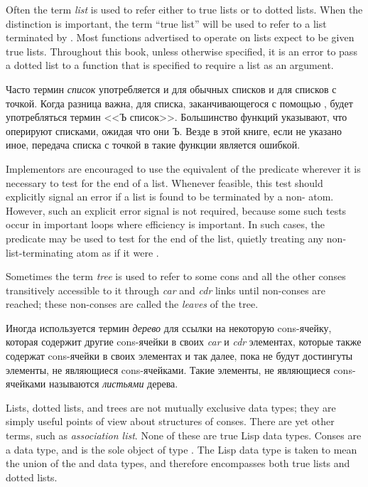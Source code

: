 Often the term {\it list} is used to refer either to true lists or to
dotted lists.  When the distinction is important,
the term ``true list'' will be used to refer to a list
terminated by {\nil}.  Most functions
advertised to operate on lists expect to be given true lists. Throughout
this book, unless otherwise specified, it is an error to pass a dotted
list to a function that is specified to require a list as an argument.

Часто термин {\it список} употребляется и для обычных списков и для списков с
точкой. Когда разница важна, для списка, заканчивающегося с помощью {\nil},
будет употребляться термин <<Ъ список>>. Большинство функций указывают, что
оперируют списками, ожидая что они Ъ. Везде в этой книге, если не указано иное,
передача списка с точкой в такие функции является ошибкой.

\beforenoterule
\begin{implementation}
Implementors are encouraged to use the equivalent
of the predicate  wherever it is necessary to test
for the end of a list.  Whenever feasible, this test should explicitly
signal an error if a list is found to be terminated by a non-{\nil} atom.
However, such an explicit error signal is not required, because
some such tests occur in important loops where efficiency is important.
In such cases, the predicate  may be used to test
for the end of the list, quietly treating any non-{\nil} list-terminating
atom as if it were {\nil}.
\end{implementation}
\afternoterule

Sometimes the term {\it tree} is used to refer to some cons
and all the other conses transitively accessible to it
through {\it car} and {\it cdr} links until non-conses are reached;
these non-conses are called the {\it leaves} of the tree.

Иногда используется термин {\it дерево} для ссылки на некоторую cons-ячейку,
которая содержит другие cons-ячейки в своих {\it car} и {\it cdr} элементах,
которые также содержат cons-ячейки в своих элементах и так далее, пока не будут
достингуты элементы, не являющиеся cons-ячейками.
Такие элементы, не являющиеся cons-ячейками называются {\it листьями} дерева.

Lists, dotted lists, and trees are not mutually exclusive data types;
they are simply useful points of view about structures of conses.
There are yet other terms, such as {\it association list}.
None of these are true Lisp data types.  Conses are a data type,
and {\nil} is the sole object of type .
The Lisp data type  is taken to mean the union of the
 and  data types, and therefore encompasses both
true lists and dotted lists.

